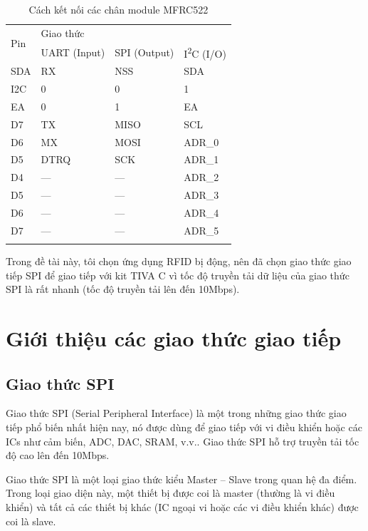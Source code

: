\begin{longtable}{p{} p{} p{} p{}} \toprule
\multirow{2}{0.1\textwidth}{Pin} & \multicolumn{3}{l}{Giao thức} \\
\cline{2-4}
& UART (Input) & SPI (Output) & I\textsuperscript{2}C (I/O) \\
\midrule
\endhead
SDA & RX & NSS & SDA \\
I2C & 0 & 0 & 1 \\
EA & 0 & 1 & EA \\
D7 & TX & MISO & SCL \\
D6 & MX & MOSI & ADR\_0 \\
D5 & DTRQ & SCK & ADR\_1 \\
D4 & --- & --- & ADR\_2 \\
D5 & --- & --- & ADR\_3 \\
D6 & --- & --- & ADR\_4 \\
D7 & --- & --- & ADR\_5 \\
\bottomrule
\caption{Cách kết nối các chân module MFRC522}
\label{tab:RC522_interface}
\end{longtable}

Trong đề tài này, tôi chọn ứng dụng RFID bị động,
nên đã chọn giao thức giao tiếp SPI để giao tiếp với kit TIVA C
vì tốc độ truyền tải dữ liệu của giao thức SPI là rất nhanh (tốc độ truyền tải lên đến \si{10}{Mbps}).

\newpage
\section{Giới thiệu các giao thức giao tiếp}
\subsection{Giao thức SPI}
Giao thức SPI (Serial Peripheral Interface) là một trong những giao thức giao tiếp phổ biến nhất hiện nay,
nó được dùng để giao tiếp với vi điều khiển hoặc các ICs như cảm biến, ADC, DAC, SRAM, v.v..
Giao thức SPI hỗ trợ truyền tải tốc độ cao lên đến \si{10}{Mbps}.

Giao thức SPI là một loại giao thức kiểu Master -- Slave trong quan hệ đa điểm.
Trong loại giao diện này, một thiết bị được coi là master (thường là vi điều khiển) và tất cả các thiết bị khác (IC ngoại vi hoặc các vi điều khiển khác) được coi là slave.

